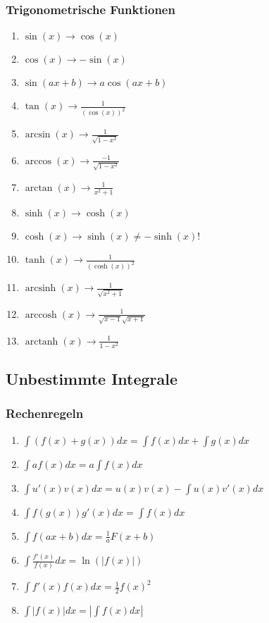 \documentclass[a4paper, 9pt, DIV=24]{scrartcl}
\DeclareMathOperator{\arcsinh}{arcsinh}
\DeclareMathOperator{\arccosh}{arccosh}
\DeclareMathOperator{\arctanh}{arctanh}
\begin{document}
\subsubsection{Trigonometrische Funktionen}
\begin{enumerate}[label={(}\arabic*{)}]
 \item $\sin(x) \rightarrow \cos(x)$
 \item $\cos(x) \rightarrow -\sin(x)$
 \item $\sin(ax+b) \rightarrow a\cos(ax+b)$
 \item $\tan(x) \rightarrow \frac{1}{(\cos(x))^2}$
 \item $\arcsin(x) \rightarrow \frac{1}{\sqrt{1-x^2}}$
 \item $\arccos(x) \rightarrow \frac{-1}{\sqrt{1-x^2}}$
 \item $\arctan(x) \rightarrow \frac{1}{x^2+1}$
 \item $\sinh(x) \rightarrow \cosh(x)$
 \item $\cosh(x) \rightarrow \sinh(x) \neq -\sinh(x)$!
 \item $\tanh(x) \rightarrow \frac{1}{(\cosh(x))^2}$
 \item $\arcsinh(x) \rightarrow \frac{1}{\sqrt{x^2+1}}$
 \item $\arccosh(x) \rightarrow \frac{1}{\sqrt{x-1}\sqrt{x+1}}$
 \item $\arctanh(x) \rightarrow \frac{1}{1-x^2}$
\end{enumerate}

\subsection{Unbestimmte Integrale}
\subsubsection{Rechenregeln}
\begin{enumerate}[label={(}\arabic*{)}]
 \item $\int(f(x)+g(x))dx = \int f(x)dx + \int g(x)dx$
 \item $\int af(x)dx = a\int f(x)dx$
 \item $\int u'(x)v(x)dx = u(x)v(x) - \int u(x)v'(x)dx$
 \item $\int f(g(x))g'(x)dx = \int f(x)dx$
 \item $\int f(ax+b)dx = \frac{1}{a}F(x+b)$
 \item $\int \frac{f'(x)}{f(x)}dx = \ln(|f(x)|)$
 \item $\int f'(x)f(x)dx = \frac{1}{2}f(x)^2$
 \item $\int |f(x)|dx = |\int f(x)dx|$
\end{enumerate}
\end{document}
